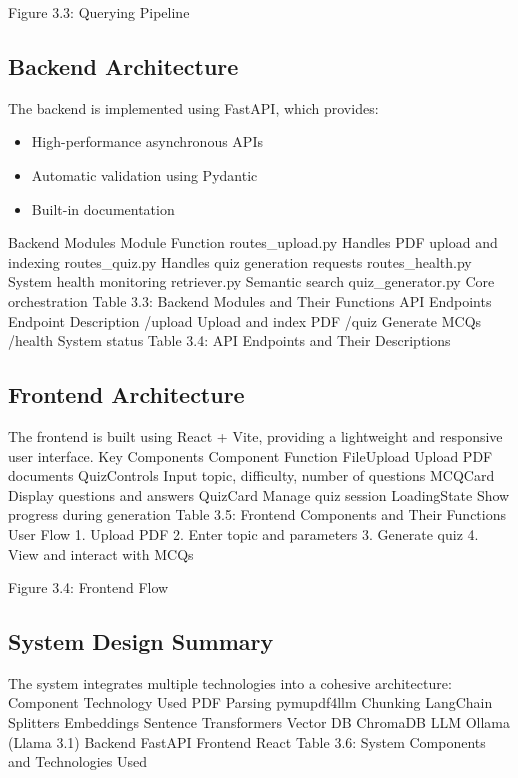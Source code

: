 \documentclass[12pt,a4paper]{report}
\begin{document}
Figure 3.3: Querying Pipeline


\subsection{Backend Architecture}
The backend is implemented using FastAPI, which provides:
\begin{itemize}
\item High-performance asynchronous APIs
\item Automatic validation using Pydantic
\item Built-in documentation
\end{itemize}
Backend Modules
Module
Function
routes\_upload.py
Handles PDF upload and indexing
routes\_quiz.py
Handles quiz generation requests
routes\_health.py
System health monitoring
retriever.py
Semantic search
quiz\_generator.py
Core orchestration
Table 3.3: Backend Modules and Their Functions
API Endpoints
Endpoint
Description
/upload
Upload and index PDF
/quiz
Generate MCQs
/health
System status
Table 3.4: API Endpoints and Their Descriptions
\subsection{Frontend Architecture}
The frontend is built using React + Vite, providing a lightweight and responsive user interface.
Key Components
Component
Function
FileUpload
Upload PDF documents
QuizControls
Input topic, difficulty, number of questions
MCQCard
Display questions and answers
QuizCard
Manage quiz session
LoadingState
Show progress during generation
Table 3.5: Frontend Components and Their Functions
User Flow
1. Upload PDF
2. Enter topic and parameters
3. Generate quiz
4. View and interact with MCQs




Figure 3.4: Frontend Flow


\subsection{System Design Summary}
The system integrates multiple technologies into a cohesive architecture:
Component
Technology Used
PDF Parsing
pymupdf4llm
Chunking
LangChain Splitters
Embeddings
Sentence Transformers
Vector DB
ChromaDB
LLM
Ollama (Llama 3.1)
Backend
FastAPI
Frontend
React
Table 3.6: System Components and Technologies Used
\end{document}
